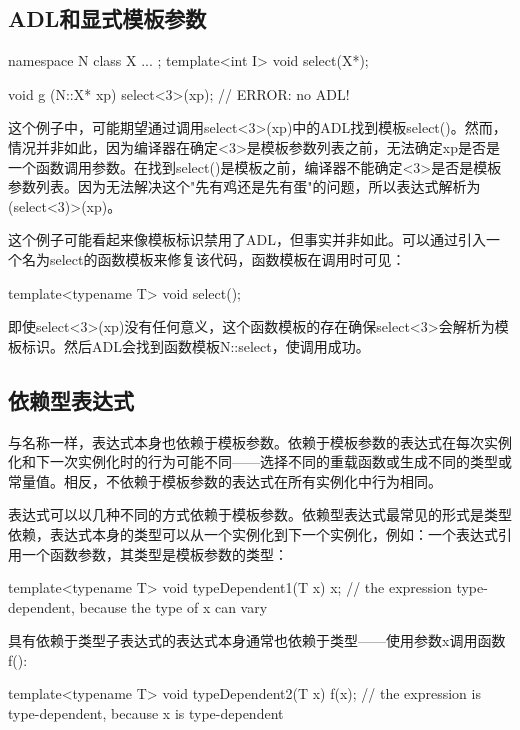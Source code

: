 \subsection{ADL和显式模板参数}

\begin{cpp}
namespace N {
	class X {
		...
	};
	template<int I> void select(X*);
}

void g (N::X* xp)
{
	select<3>(xp); // ERROR: no ADL!
}
\end{cpp}

这个例子中，可能期望通过调用select<3>(xp)中的ADL找到模板select()。然而，情况并非如此，因为编译器在确定<3>是模板参数列表之前，无法确定xp是否是一个函数调用参数。在找到select()是模板之前，编译器不能确定<3>是否是模板参数列表。因为无法解决这个"先有鸡还是先有蛋"的问题，所以表达式解析为(select<3)>(xp)。

这个例子可能看起来像模板标识禁用了ADL，但事实并非如此。可以通过引入一个名为select的函数模板来修复该代码，函数模板在调用时可见：

\begin{cpp}
template<typename T> void select();
\end{cpp}

即使select<3>(xp)没有任何意义，这个函数模板的存在确保select<3>会解析为模板标识。然后ADL会找到函数模板N::select，使调用成功。

\subsection{依赖型表达式}

与名称一样，表达式本身也依赖于模板参数。依赖于模板参数的表达式在每次实例化和下一次实例化时的行为可能不同——选择不同的重载函数或生成不同的类型或常量值。相反，不依赖于模板参数的表达式在所有实例化中行为相同。

表达式可以以几种不同的方式依赖于模板参数。依赖型表达式最常见的形式是类型依赖，表达式本身的类型可以从一个实例化到下一个实例化，例如：一个表达式引用一个函数参数，其类型是模板参数的类型：

\begin{cpp}
template<typename T> void typeDependent1(T x)
{
	x; // the expression type-dependent, because the type of x can vary
}
\end{cpp}

具有依赖于类型子表达式的表达式本身通常也依赖于类型——使用参数x调用函数f():

\begin{cpp}
template<typename T> void typeDependent2(T x)
{
	f(x); // the expression is type-dependent, because x is type-dependent
}
\end{cpp}

